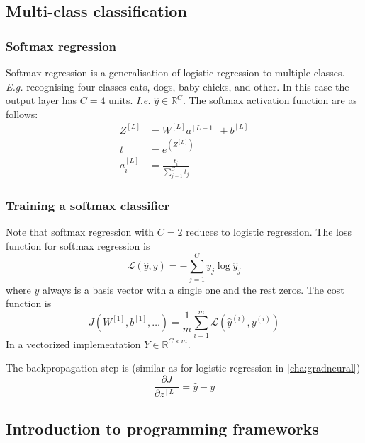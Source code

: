 \documentclass{article}
\begin{document}
\subsection{Multi-class classification}
\subsubsection{Softmax regression}
Softmax regression is a generalisation of logistic regression to multiple classes.
\emph{E.g.} recognising four classes cats, dogs, baby chicks, and other.
In this case the output layer has $C=4$ units.
\emph{I.e.} $\hat{y}\in\mathbb{R}^C$.
The softmax activation function are as follows:
\begin{equation}
  \begin{split}
    Z^{[L]}&=W^{[L]}a^{[L-1]}+b^{[L]}\\
    t&=e^{(Z^{[L]})}\\
    a_i^{[L]}&=\frac{t_i}{\sum_{j=1}^C t_j}
  \end{split}
\end{equation}

\subsubsection{Training a softmax classifier}
Note that softmax regression with $C=2$ reduces to logistic regression.
The loss function for softmax regression is
\begin{equation}
  \mathcal{L}(\hat{y},y)=-\sum_{j=1}^C y_j\log\hat{y}_j
\end{equation}
where $y$ always is a basis vector with a single one and the rest zeros.
The cost function is
\begin{equation}
  J(W^{[1]},b^{[1]},\ldots)=\frac{1}{m}\sum_{i=1}^m\mathcal{L}(\hat{y}^{(i)},y^{(i)})
\end{equation}
In a vectorized implementation $Y\in\mathbb{R}^{C\times m}$.

The backpropagation step is (similar as for logistic regression in \cref{cha:gradneural})
\begin{equation}
  \frac{\partial J}{\partial z^{[L]}}=\hat{y}-y
\end{equation}

\subsection{Introduction to programming frameworks}
\end{document}
